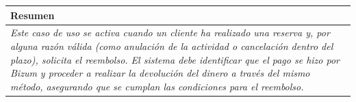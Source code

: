     \begin{table}[H]
        \begin{tabular}{llllllll}
    \hline
    \multicolumn{8}{|l|}{\cellcolor[HTML]{F2F2F2}Resumen}                                                                                                                                                                                                                                                                                                                                                                                             \\ \hline
    \multicolumn{8}{|p{15cm}|}{{\color[HTML]{808080} \textit{Este caso de uso se activa cuando un cliente ha realizado una reserva y, por alguna razón válida (como anulación de la actividad o cancelación dentro del plazo), solicita el reembolso. El sistema debe identificar que el pago se hizo por Bizum y proceder a realizar la devolución del dinero a través del mismo método, asegurando que se cumplan las condiciones para el reembolso.}}} \\ \hline
    \end{tabular}
    \end{table}


